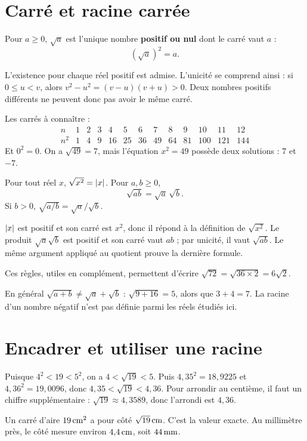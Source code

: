 \documentclass[../cours_3e.tex]{subfiles}
\begin{document}
\section{Carré et racine carrée}
\begin{definition}
Pour $a\geq0$, $\sqrt a$ est l'unique nombre \textbf{positif ou nul} dont le carré vaut $a$ :
\[(\sqrt a)^2=a.\]
\end{definition}
L'existence pour chaque réel positif est admise. L'unicité se comprend ainsi : si $0\leq u<v$, alors $v^2-u^2=(v-u)(v+u)>0$. Deux nombres positifs différents ne peuvent donc pas avoir le même carré.

Les carrés à connaître :
\[
\begin{array}{c|rrrrrrrrrrrr}
n&1&2&3&4&5&6&7&8&9&10&11&12\\\hline
n^2&1&4&9&16&25&36&49&64&81&100&121&144
\end{array}
\]
Et $0^2=0$. On a $\sqrt{49}=7$, mais l'équation $x^2=49$ possède deux solutions : $7$ et $-7$.
\begin{propriete}
Pour tout réel $x$, $\sqrt{x^2}=\left|x\right|$. Pour $a,b\geq0$,
\[\sqrt{ab}=\sqrt a\,\sqrt b.\]
Si $b>0$, $\sqrt{a/b}=\sqrt a/\sqrt b$.
\end{propriete}
\begin{demonstration}
$\left|x\right|$ est positif et son carré est $x^2$, donc il répond à la définition de $\sqrt{x^2}$. Le produit $\sqrt a\sqrt b$ est positif et son carré vaut $ab$ ; par unicité, il vaut $\sqrt{ab}$. Le même argument appliqué au quotient prouve la dernière formule.
\end{demonstration}
Ces règles, utiles en complément, permettent d'écrire $\sqrt{72}=\sqrt{36\times2}=6\sqrt2$.
\begin{attention}
En général $\sqrt{a+b}\ne\sqrt a+\sqrt b$ : $\sqrt{9+16}=5$, alors que $3+4=7$. La racine d'un nombre négatif n'est pas définie parmi les réels étudiés ici.
\end{attention}
\section{Encadrer et utiliser une racine}
Puisque $4^2<19<5^2$, on a $4<\sqrt{19}<5$. Puis $4{,}35^2=18{,}9225$ et $4{,}36^2=19{,}0096$, donc $4{,}35<\sqrt{19}<4{,}36$. Pour arrondir au centième, il faut un chiffre supplémentaire : $\sqrt{19}\approx4{,}3589$, donc l'arrondi est $4{,}36$.
\begin{exemple}
Un carré d'aire $19\,\mathrm{cm^2}$ a pour côté $\sqrt{19}\,\mathrm{cm}$. C'est la valeur exacte. Au millimètre près, le côté mesure environ $4{,}4\,\mathrm{cm}$, soit $44\,\mathrm{mm}$.
\end{exemple}
\end{document}
